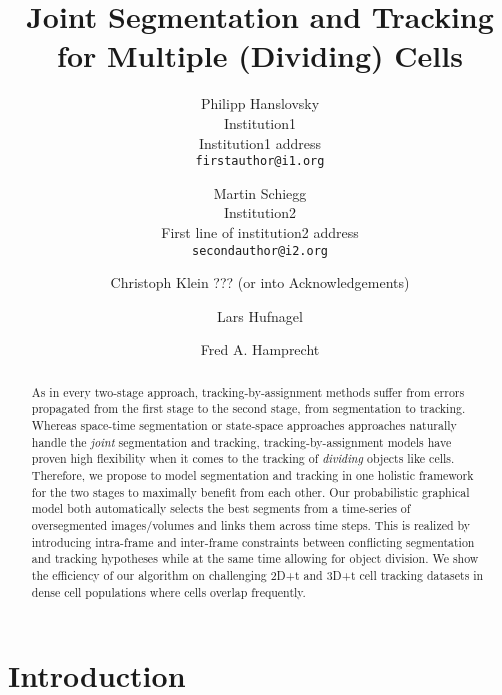 \documentclass[10pt,twocolumn,letterpaper]{article}
\begin{document}
\title{Joint Segmentation and Tracking for Multiple (Dividing) Cells}

\author{Philipp Hanslovsky\\
Institution1\\
Institution1 address\\
{\tt\small firstauthor@i1.org}
\and
Martin Schiegg\\
Institution2\\
First line of institution2 address\\
{\tt\small secondauthor@i2.org}
\and 
Christoph Klein ??? (or into Acknowledgements)
\and
Lars Hufnagel
\and
Fred A. Hamprecht
}

\maketitle

\begin{abstract}
   As in every two-stage approach, tracking-by-assignment methods suffer from errors propagated from the first stage
   to the second stage, \ie from segmentation to tracking. Whereas space-time segmentation or state-space approaches
   approaches naturally handle the \emph{joint} segmentation and tracking, 
   tracking-by-assignment models have proven high flexibility when it comes to the tracking of \emph{dividing}
   objects like cells. Therefore, we propose to model segmentation and tracking in one holistic framework for
   the two stages to maximally benefit from each other. Our probabilistic graphical model both automatically selects
   the best segments from a time-series of oversegmented images/volumes and links them across time steps. This is realized
   by introducing intra-frame and inter-frame constraints between conflicting segmentation and tracking hypotheses while
   at the same time allowing
   for object division.
   We show the efficiency of our algorithm on challenging 2D+t and 3D+t cell tracking datasets in dense cell populations
   where cells overlap frequently.
\end{abstract}

\section{Introduction}
\label{sec:introduction}
\end{document}
